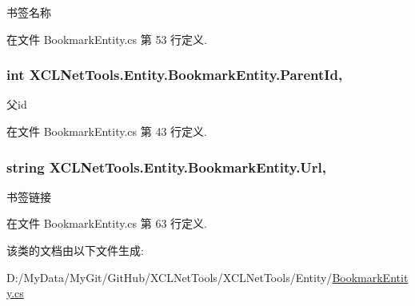 书签名称 



在文件 Bookmark\-Entity.\-cs 第 53 行定义.

\hypertarget{class_x_c_l_net_tools_1_1_entity_1_1_bookmark_entity_afd3c2002aa8d5edeac06f6ef32ba7454}{
\subsubsection[{Parent\-Id}]{\setlength{\rightskip}{0pt plus 5cm}int X\-C\-L\-Net\-Tools.\-Entity.\-Bookmark\-Entity.\-Parent\-Id\hspace{0.3cm}{\ttfamily [get]}, {\ttfamily [set]}}}\label{class_x_c_l_net_tools_1_1_entity_1_1_bookmark_entity_afd3c2002aa8d5edeac06f6ef32ba7454}


父id 



在文件 Bookmark\-Entity.\-cs 第 43 行定义.

\hypertarget{class_x_c_l_net_tools_1_1_entity_1_1_bookmark_entity_a88ebfe2441fd5804a82f5eaee1ce3232}{
\subsubsection[{Url}]{\setlength{\rightskip}{0pt plus 5cm}string X\-C\-L\-Net\-Tools.\-Entity.\-Bookmark\-Entity.\-Url\hspace{0.3cm}{\ttfamily [get]}, {\ttfamily [set]}}}\label{class_x_c_l_net_tools_1_1_entity_1_1_bookmark_entity_a88ebfe2441fd5804a82f5eaee1ce3232}


书签链接 



在文件 Bookmark\-Entity.\-cs 第 63 行定义.



该类的文档由以下文件生成\-:\begin{DoxyCompactItemize}
\item 
D\-:/\-My\-Data/\-My\-Git/\-Git\-Hub/\-X\-C\-L\-Net\-Tools/\-X\-C\-L\-Net\-Tools/\-Entity/\hyperlink{_bookmark_entity_8cs}{Bookmark\-Entity.\-cs}\end{DoxyCompactItemize}
